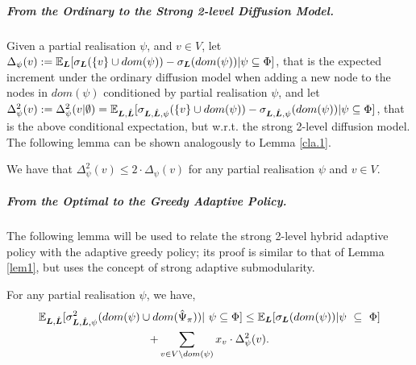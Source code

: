 \subparagraph*{From the Ordinary to the Strong 2-level Diffusion Model.}
Given a partial realisation $\psi$, and $v\in V$, let $\Delta_\psi(v):=\mathbb{E}_{\bm L}[\sigma_{\bm L}(\{v\}\cup dom(\psi))-\sigma_{\bm L}(dom(\psi))|\psi \subseteq \Phi]$, that is the expected increment under the ordinary diffusion model when adding a new node to the nodes in $dom(\psi)$ conditioned by partial realisation $\psi$, and let $\Delta^2_\psi(v):=\Delta^{2}_{\psi}(v|\emptyset)=\mathbb{E}_{\bm L,\hat{\bm L}}[\sigma_{\bm L,\hat{\bm L},\psi}(\{v\}\cup dom(\psi))-\sigma_{\bm L,\hat{\bm L},\psi}(dom(\psi))|\psi \subseteq  \Phi]$, that is the above conditional expectation, but w.r.t. the strong 2-level diffusion model. The following lemma can be shown analogously to Lemma \ref{cla.1}.
\begin{lemma}\label{scla.1}
We have that $\Delta^2_\psi(v)\leq 2\cdot \Delta_\psi(v)$ for any partial realisation $\psi$ and $v\in V$. 
\end{lemma}
\subparagraph*{From the Optimal to the Greedy Adaptive Policy.}
The following lemma will be used to relate the strong 2-level hybrid adaptive policy with the adaptive greedy policy; its proof is similar to that of Lemma \ref{lem1}, but uses the concept of strong adaptive submodularity.
\begin{lemma}\label{slem1}
For any partial realisation $\psi$, we have,
\begin{multline}
\mathbb{E}_{\bm L,\hat{\bm L}}[\sigma^{2}_{\bm L,\hat{\bm L},\psi}(dom(\psi)\cup dom(\hat{\Psi}_{\pi}))|~\psi\subseteq\Phi]\leq \mathbb{E}_{\bm L}[\sigma_{\bm L}(dom(\psi))|\psi~\subseteq~\Phi]\\
+\sum_{v\in V\setminus dom(\psi)}x_v\cdot \Delta^2_\psi(v).
\end{multline}
\end{lemma}

